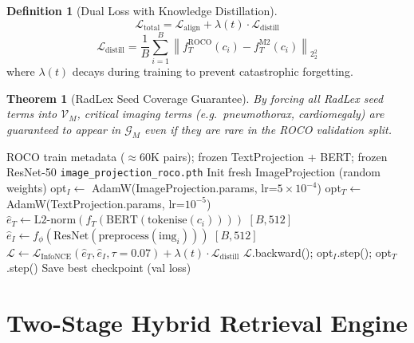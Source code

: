 \documentclass[12pt,a4paper]{article}
\theoremstyle{definition}
\newtheorem{definition}{Definition}[section]
\theoremstyle{plain}
\newtheorem{theorem}{Theorem}[section]
\theoremstyle{remark}
\newcommand{\Norm}[1]{\left\|#1\right\|_2}
\newcommand{\KG}{\mathcal{G}}
\begin{document}
\begin{definition}[Dual Loss with Knowledge Distillation]
\[
  \mathcal{L}_{\text{total}} = \mathcal{L}_{\text{align}} + \lambda(t) \cdot \mathcal{L}_{\text{distill}}
\]
\[
  \mathcal{L}_{\text{distill}} = \frac{1}{B}\sum_{i=1}^B \Norm{f_T^{\text{ROCO}}(c_i) - f_T^{\text{M2}}(c_i)}_2^2
\]
where $\lambda(t)$ decays during training to prevent catastrophic forgetting.
\end{definition}

\begin{theorem}[RadLex Seed Coverage Guarantee]
By forcing all RadLex seed terms into $\mathcal{V}_M$, critical imaging terms (e.g.\ \emph{pneumothorax}, \emph{cardiomegaly}) are guaranteed to appear in $\KG_M$ even if they are rare in the ROCO validation split.
\end{theorem}

\begin{algorithm}[H]
\caption{Fine-tune ImageProjection for ROCO Medical Domain}
\label{alg:finetune_roco}
\begin{algorithmic}[1]
\Require ROCO train metadata ($\approx$60K pairs); frozen TextProjection + BERT; frozen ResNet-50
\Ensure \texttt{image\_projection\_roco.pth}
\State Init fresh ImageProjection (random weights)
\State opt$_I \gets$ AdamW(ImageProjection.params, lr=$5\times10^{-4}$)
\State opt$_T \gets$ AdamW(TextProjection.params, lr=$10^{-5}$) 
    \State $\hat{e}_T \gets \text{L2-norm}(f_T(\text{BERT}(\text{tokenise}(c_i))))$ \quad $[B,512]$
    \State $\hat{e}_I \gets f_\phi(\text{ResNet}(\text{preprocess}(\text{img}_i)))$ \quad $[B,512]$
    \State $\mathcal{L} \gets \mathcal{L}_{\text{InfoNCE}}(\hat{e}_T, \hat{e}_I, \tau{=}0.07) + \lambda(t)\cdot\mathcal{L}_{\text{distill}}$
    \State $\mathcal{L}$.backward(); opt$_I$.step(); opt$_T$.step()
  \EndFor
  \State Save best checkpoint (val loss)
\EndFor
\end{algorithmic}
\end{algorithm}

\newpage
\section{Two-Stage Hybrid Retrieval Engine}
\label{sec:retrieval}
\end{document}

